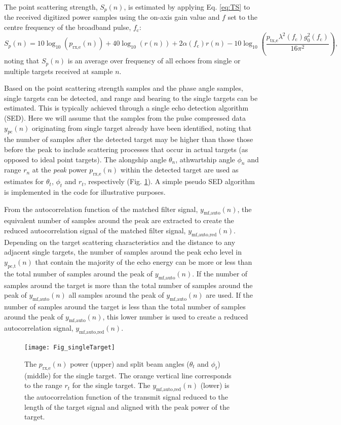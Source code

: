 \documentclass[preprint,12pt,TurnOnLineNumbers]{JASAnew}
\newcommand{\samplesymt}{n}
\newcommand{\fc}{f_{\textrm{c}}}
\newcommand{\ptxe}{p_{\textrm{tx,e}}}
\newcommand{\prxe}{p_{\textrm{rx,e}}}
\newcommand{\ypc}{y_{\textrm{pc}}}
\newcommand{\ypctarget}{y_{\textrm{pc,t}}}
\newcommand{\ymfauto}{y_{\textrm{mf,auto}}}
\newcommand{\ymfautored}{y_{\textrm{mf,auto,red}}}
\newcommand{\mysp}{S_p}
\newcommand{\range}{r}
\newcommand{\athw}{\phi}
\newcommand{\along}{\theta}
\newcommand{\gainzero}{g_0}
\newcommand{\wlen}{\lambda}
\newcommand{\absorp}{\alpha}
\begin{document}
The point scattering strength, $\mysp(\samplesymt)$, is estimated by applying Eq. \ref{eq:TS} to the received digitized power samples using the on-axis gain value and $f$ set to the centre frequency of the broadband pulse, $\fc$: 
\begin{equation}
\label{eq:Sp}
\mysp(\samplesymt) = 10\log_{10}(\prxe(\samplesymt)) + 40\log_{10}(\range(\samplesymt)) 
+ 2\absorp(\fc) \range(\samplesymt) - 10\log_{10}\left( \frac{\ptxe \wlen^2(\fc) \gainzero^2(\fc)}{16\pi^2} \right),
\end{equation}
%
noting that $\mysp(\samplesymt)$ is an average over frequency of all echoes from single or multiple targets received at sample $\samplesymt$.

Based on the point scattering strength samples and the phase angle samples, single targets can be detected, and range and bearing to the single targets can be estimated. This is typically achieved through a single echo detection algorithm (SED). Here we will assume that the samples from the pulse compressed data $\ypc(\samplesymt)$ originating from single target already have been identified, noting that the number of samples after the detected target may be higher than those those before the peak to include scattering processes that occur in actual targets (as opposed to ideal point targets). The alongship angle $\along_n$, athwartship angle $\athw_n$ and range $r_n$ at the \emph{peak} power $\prxe(\samplesymt)$ within the detected target are used as estimates for $\along_t$, $\athw_t$ and $r_t$, respectively (Fig. \ref{fi:SED}). A simple pseudo SED algorithm is implemented in the code for illustrative purposes.

From the autocorrelation function of the matched filter signal, $\ymfauto(\samplesymt)$, the equivalent number of samples around the peak are extracted to create the reduced autocorrelation signal of the matched filter signal, $\ymfautored(\samplesymt)$. Depending on the target scattering characteristics and the distance to any adjacent single targets, the number of samples around the peak echo level in $\ypctarget(\samplesymt)$ that contain the majority of the echo energy can be more or less than the total number of samples around the peak of $\ymfauto(\samplesymt)$. If the number of samples around the target is more than the total number of samples around the peak of $\ymfauto(\samplesymt)$ all samples around the peak of $\ymfauto(\samplesymt)$ are used. If the number of samples around the target is less than the total number of samples around the peak of $\ymfauto(\samplesymt)$, this lower number is used to create a reduced autocorrelation signal, $\ymfautored(\samplesymt)$.
%
\begin{figure}
\texttt{[image: Fig\_singleTarget]}
\caption{\label{fi:SED} The $\prxe(\samplesymt)$ power (upper) and split beam angles ($\along_t$ and $\athw_t$) (middle) for the single target. The orange vertical line corresponds to the range $r_t$ for the single target. The $\ymfautored(\samplesymt)$ (lower) is the autocorrelation function of the transmit signal reduced to the length of the target signal and aligned with the peak power of the target.}
\end{figure}
\end{document}
